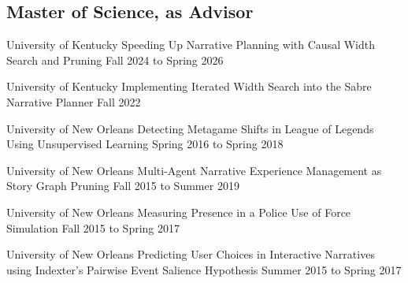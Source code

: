 \documentclass{cv}
\begin{document}
\subsection*{Master of Science, as Advisor}
\begin{etaremune}[itemsep=0pt,parsep=0pt]
	\item {}
		{University of Kentucky}
		{Speeding Up Narrative Planning with Causal Width Search and Pruning}
		{Fall 2024 to Spring 2026}
	\item {}
		{University of Kentucky}
		{Implementing Iterated Width Search into the Sabre Narrative Planner}
		{Fall 2022}
	\item {}
		{University of New Orleans}
		{Detecting Metagame Shifts in League of Legends Using Unsupervised Learning}
		{Spring 2016 to Spring 2018}
	\item {}
		{University of New Orleans}
		{Multi-Agent Narrative Experience Management as Story Graph Pruning}
		{Fall 2015 to Summer 2019}
	\item {}
		{University of New Orleans}
		{Measuring Presence in a Police Use of Force Simulation}
		{Fall 2015 to Spring 2017}
	\item {}
		{University of New Orleans}
		{Predicting User Choices in Interactive Narratives using Indexter's Pairwise Event Salience Hypothesis}
		{Summer 2015 to Spring 2017}
\end{etaremune}
\end{document}
